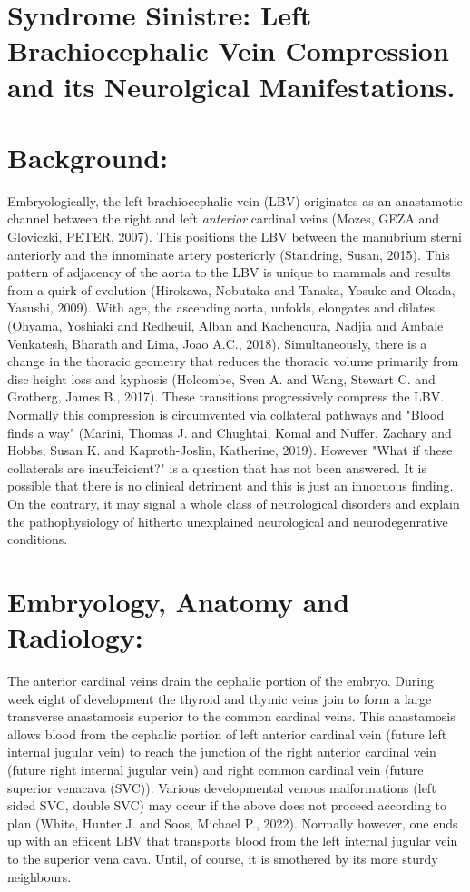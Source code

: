 \documentclass{article}
\author{arcotpixel}
\date{\today}
\title{}
\begin{document}
\section*{Syndrome Sinistre: Left Brachiocephalic Vein Compression and its Neurolgical Manifestations.}
\label{sec:org47e8791}
\section*{Background:}
\label{sec:orge916ee1}
Embryologically, the left brachiocephalic vein (LBV) originates as an anastamotic channel between the right and left \emph{anterior} cardinal veins (Mozes, GEZA and Gloviczki, PETER, 2007).
This positions the LBV between the manubrium sterni anteriorly and the innominate artery posteriorly (Standring, Susan, 2015).
This pattern of adjacency of the aorta to the LBV is unique to mammals and results from a quirk of evolution (Hirokawa, Nobutaka and Tanaka, Yosuke and Okada, Yasushi, 2009).
With age, the ascending aorta, unfolds, elongates and dilates (Ohyama, Yoshiaki and Redheuil, Alban and Kachenoura, Nadjia and Ambale Venkatesh, Bharath and Lima, Joao A.C., 2018).
Simultaneously, there is a change in the thoracic geometry that reduces the thoracic volume primarily from disc height loss and kyphosis (Holcombe, Sven A. and Wang, Stewart C. and Grotberg, James B., 2017).
These transitions progressively compress the LBV. Normally this compression is circumvented via collateral pathways and "Blood finds a way" (Marini, Thomas J. and Chughtai, Komal and Nuffer, Zachary and Hobbs, Susan K. and Kaproth-Joslin, Katherine, 2019).
However "What if these collaterals are insuffcicient?" is a question that has not been answered. It is possible that there is no clinical detriment and this is just an innocuous finding.
On the contrary, it may signal a whole class of neurological disorders and explain the pathophysiology of hitherto unexplained neurological and neurodegenrative conditions.

\section*{Embryology, Anatomy and Radiology:}
\label{sec:orgc96e9bd}
The anterior cardinal veins drain the cephalic portion of the embryo.
During week eight of development the thyroid and thymic veins join to form a large transverse anastamosis superior to the common cardinal veins.
This anastamosis allows blood from the cephalic portion of left anterior cardinal vein (future left internal jugular vein) to reach the junction of the right anterior cardinal vein (future right internal jugular vein) and right common cardinal vein (future superior venacava (SVC)).
Various developmental venous malformations (left sided SVC, double SVC) may occur if the above does not proceed according to plan (White, Hunter J. and Soos, Michael P., 2022).
Normally however, one ends up with an efficent LBV that transports blood from the left internal jugular vein to the superior vena cava.
Until, of course, it is smothered by its more sturdy neighbours.
\end{document}
